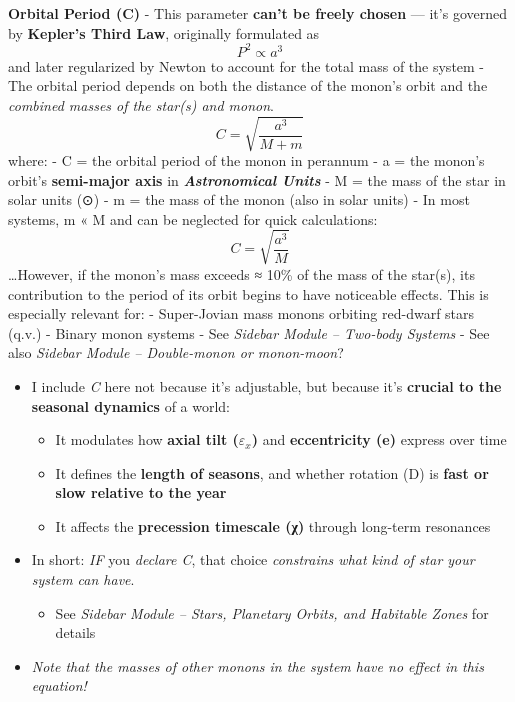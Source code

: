 \documentclass[
  letterpaper,
]{book}
\providecommand{\tightlist}{%
  \setlength{\itemsep}{0pt}\setlength{\parskip}{0pt}}
\begin{document}
\textbf{Orbital Period (C)} - This parameter \textbf{can't be freely
chosen} --- it's governed by \textbf{Kepler's Third Law}, originally
formulated as \[P^2 \propto a^3\]and later regularized by Newton to
account for the total mass of the system - The orbital period depends on
both the distance of the monon's orbit and the \emph{combined masses of
the star(s) and monon}. \[C = \sqrt{\dfrac{a^3}{M + m}}\] where: - C =
the orbital period of the monon in perannum - a = the monon's orbit's
\textbf{semi-major axis} in \textbf{\emph{Astronomical Units}} - M = the
mass of the star in solar units (⊙) - m = the mass of the monon (also in
solar units) - In most systems, m « M and can be neglected for quick
calculations: \[C = \sqrt{\dfrac{a^3}{M}}\] \ldots However, if the
monon's mass exceeds ≈ 10\% of the mass of the star(s), its contribution
to the period of its orbit begins to have noticeable effects. This is
especially relevant for: - Super-Jovian mass monons orbiting red-dwarf
stars (q.v.) - Binary monon systems - See \emph{Sidebar Module --
Two-body Systems} - See also \emph{Sidebar Module -- Double-monon or
monon-moon}?

\begin{itemize}
\tightlist
\item
  I include \emph{C} here not because it's adjustable, but because it's
  \textbf{crucial to the seasonal dynamics} of a world:

  \begin{itemize}
  \tightlist
  \item
    It modulates how \textbf{axial tilt (\(\varepsilon_x\))} and
    \textbf{eccentricity (e)} express over time\\
  \item
    It defines the \textbf{length of seasons}, and whether rotation (D)
    is \textbf{fast or slow relative to the year}\\
  \item
    It affects the \textbf{precession timescale (χ)} through long-term
    resonances
  \end{itemize}
\item
  In short: \emph{IF} you \emph{declare C}, that choice \emph{constrains
  what kind of star your system can have}.

  \begin{itemize}
  \tightlist
  \item
    See \emph{Sidebar Module -- Stars, Planetary Orbits, and Habitable
    Zones} for details
  \end{itemize}
\item
  \emph{Note that the masses of other monons in the system have no
  effect in this equation!}
\end{itemize}
\end{document}
